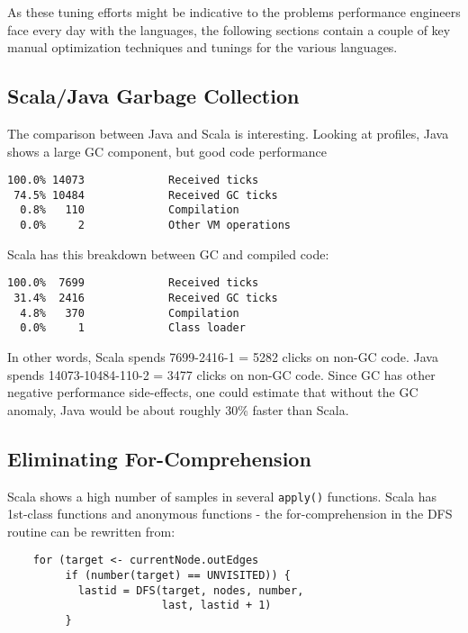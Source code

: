 As these tuning efforts might be indicative to the problems
performance engineers face every day with the languages, the following
sections contain a couple of key manual optimization techniques and
tunings for the various languages.

\subsection{Scala/Java Garbage Collection}

The comparison between Java and Scala is interesting. Looking at
profiles, Java shows a large GC component, but good code performance

\begin{footnotesize}
\begin{verbatim}
100.0% 14073             Received ticks
 74.5% 10484             Received GC ticks
  0.8%   110             Compilation
  0.0%     2             Other VM operations
\end{verbatim}
\end{footnotesize}

Scala has this breakdown between GC and compiled code:

\begin{footnotesize}
\begin{verbatim}
100.0%  7699             Received ticks
 31.4%  2416             Received GC ticks
  4.8%   370             Compilation
  0.0%     1             Class loader
\end{verbatim}
\end{footnotesize}

In other words, Scala spends 7699-2416-1 = 5282 clicks on non-GC
code. Java spends 14073-10484-110-2 = 3477 clicks on non-GC
code. Since GC has other negative performance side-effects, one could
estimate that without the GC anomaly, Java would be about
roughly 30\% faster than Scala.


\subsection{Eliminating For-Comprehension}

Scala shows a high number of samples in several {\tt apply()}
functions.  Scala has 1st-class functions and anonymous functions -
the for-comprehension in the DFS routine can be rewritten from:

\begin{footnotesize}
\begin{verbatim}
    for (target <- currentNode.outEdges
         if (number(target) == UNVISITED)) {
           lastid = DFS(target, nodes, number, 
                        last, lastid + 1)
         }
\end{verbatim}
\end{footnotesize}

